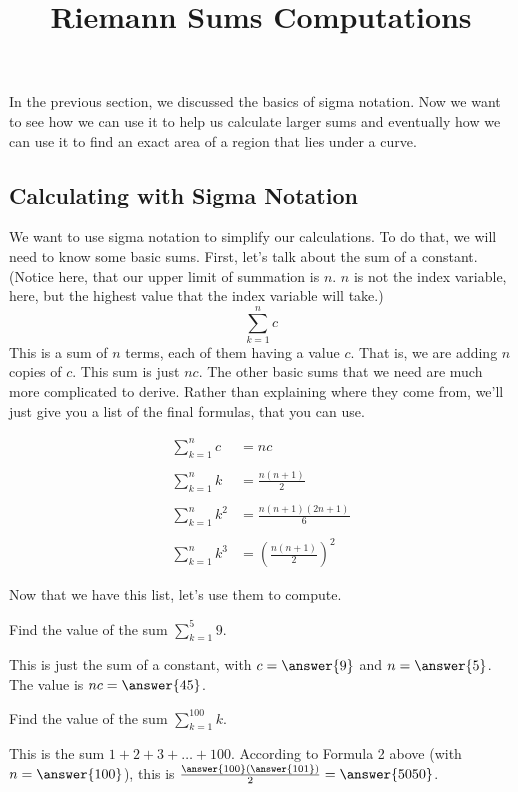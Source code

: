 \documentclass{ximera}
\title{Riemann Sums Computations}
\begin{document}
\maketitle
In the previous section, we discussed the basics of sigma notation. Now we want to see how we can use it to help us calculate larger sums and eventually how we can use it to find an exact area of a region that lies under a curve.

\subsection{Calculating with Sigma Notation}
 We want to use sigma notation to simplify our calculations.  To do that, we will need to know some basic sums.  
 First, let's talk about the sum of a constant.  (Notice here, that our upper limit of summation is $n$.  $n$ is not the index 
 variable, here, but the highest value that the index variable will take.)
 \[ \sum_{k=1}^n c \] 
 This is a sum of $n$ terms, each of them having a value $c$.  That is, we are adding $n$ copies of $c$.  This sum is just $nc$.
 The other basic sums that we need are much more complicated to derive.  Rather than explaining where they come from, we'll just give you
 a list of the final formulas, that you can use.
 
 \begin{align*}
	\sum_{k=1}^n c &= nc \\ \\
	\sum_{k=1}^n k &= \frac{n(n+1)}{2} \\ \\
	\sum_{k=1}^n k^2 &= \frac{n(n+1)(2n+1)}{6} \\ \\
	\sum_{k=1}^n k^3 &= \left(\frac{n(n+1)}{2}\right)^2
\end{align*} 


Now that we have this list, let's use them to compute.
\begin{example}
	Find the value of the sum $\displaystyle \sum_{k=1}^{5} 9$.
	\begin{explanation}
		This is just the sum of a constant, with $c=\answer{9}$ and $n=\answer{5}$.  The value is $nc=\answer{45}$.	
	\end{explanation}
\end{example}

 

\begin{example}
	Find the value of the sum $\displaystyle \sum_{k=1}^{100} k$.
	\begin{explanation}
		This is the sum $1+2+3+ \ldots + 100$.  According to Formula 2 above (with $n=\answer{100}$), this is $\frac{\answer{100}(\answer{101})}{2} = \answer{5050}$.	
	\end{explanation}
\end{example}
\end{document}
